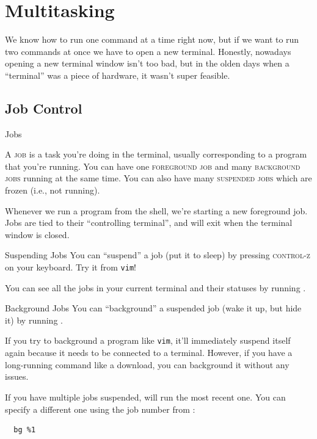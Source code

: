 \section{Multitasking}

We know how to run one command at a time right now, but if we want to run two
commands at once we have to open a new terminal.  Honestly, nowadays opening a
new terminal window isn't too bad, but in the olden days when a
\enquote{terminal} was a piece of hardware, it wasn't super feasible.

\subsection{Job Control}

\begin{frame}{Jobs}
  \begin{definition}[job]
    A \textsc{job} is a task you're doing in the terminal, usually
    corresponding to a program that you're running.  You can have one
    \textsc{foreground job} and many \textsc{background jobs} running at the
    same time.  You can also have many \textsc{suspended jobs} which are
    frozen (i.e., not running).
  \end{definition}

  \pause

  Whenever we run a program from the shell, we're starting a new foreground
  job.  Jobs are tied to their \enquote{controlling terminal}, and will exit
  when the terminal window is closed.
\end{frame}

\begin{frame}{Suspending Jobs}
  You can \enquote{suspend} a job (put it to sleep) by pressing
  \textsc{control-z} on your keyboard.  Try it from \texttt{vim}!

  \pause

  You can see all the jobs in your current terminal and their statuses by
  running .
\end{frame}

\begin{frame}[fragile]{Background Jobs}
  You can \enquote{background} a suspended job (wake it up, but hide it) by running .

  \pause

  If you try to background a program like \texttt{vim}, it'll immediately
  suspend itself again because it needs to be connected to a terminal. However,
  if you have a long-running command like a download, you can background it
  without any issues.

  If you have multiple jobs suspended,  will run the most recent one.
  You can specify a different one using the job number from :

  \begin{verbatim}
  bg %1
  \end{verbatim}
\end{frame}

